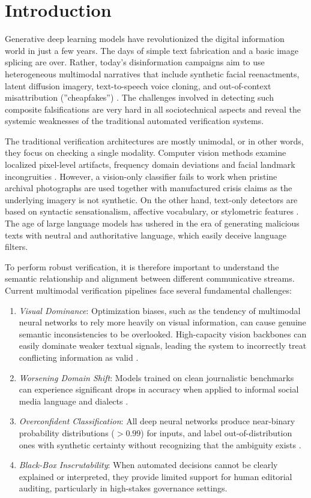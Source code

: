 \documentclass[conference]{IEEEtran}
\begin{document}
\section{Introduction}
Generative deep learning models have revolutionized the digital information world in just a few years. The days of simple text fabrication and a basic image splicing are over. Rather, today's disinformation campaigns aim to use heterogeneous multimodal narratives that include synthetic facial reenactments, latent diffusion imagery, text-to-speech voice cloning, and out-of-context misattribution (''cheapfakes'') \cite{alam2022survey}. The challenges involved in detecting such composite falsifications are very hard in all sociotechnical aspects and reveal the systemic weaknesses of the traditional automated verification systems.

The traditional verification architectures are mostly unimodal, or in other words, they focus on checking a single modality. Computer vision methods examine localized pixel-level artifacts, frequency domain deviations and facial landmark incongruities \cite{rossler2019faceforensics, dolhansky2020deepfake}. However, a vision-only classifier fails to work when pristine archival photographs are used together with manufactured crisis claims as the underlying imagery is not synthetic. On the other hand, text-only detectors are based on syntactic sensationalism, affective vocabulary, or stylometric features \cite{devlin2019bert}. The age of large language models has ushered in the era of generating malicious texts with neutral and authoritative language, which easily deceive language filters.

To perform robust verification, it is therefore important to understand the semantic relationship and alignment between different communicative streams. Current multimodal verification pipelines face several fundamental challenges:
\begin{enumerate}
    \item \textit{Visual Dominance}: Optimization biases, such as the tendency of multimodal neural networks to rely more heavily on visual information, can cause genuine semantic inconsistencies to be overlooked. High-capacity vision backbones can easily dominate weaker textual signals, leading the system to incorrectly treat conflicting information as valid \cite{aneja2021cosmos}.
    \item \textit{Worsening Domain Shift}: Models trained on clean journalistic benchmarks can experience significant drops in accuracy when applied to informal social media language and dialects \cite{nakamura2020fakeddit}.
    \item \textit{Overconfident Classification}: All deep neural networks produce near-binary probability distributions ($> 0.99$) for inputs, and label out-of-distribution ones with synthetic certainty without recognizing that the ambiguity exists \cite{guo2017calibration}.
    \item \textit{Black-Box Inscrutability}: When automated decisions cannot be clearly explained or interpreted, they provide limited support for human editorial auditing, particularly in high-stakes governance settings.
\end{enumerate}
\end{document}
